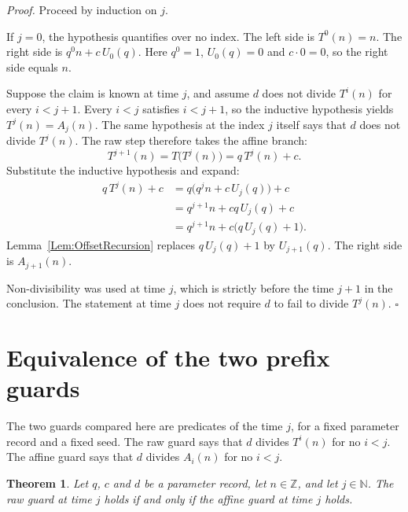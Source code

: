 \documentclass[11pt,letterpaper]{article}
\newcommand{\N}{\mathbb{N}}
\newcommand{\Z}{\mathbb{Z}}
\newtheorem{theorem}{Theorem}
\newenvironment{proof}{\noindent\textit{Proof.}}{\hfill\(\square\)}
\begin{document}
\begin{proof}
Proceed by induction on \(j\).

If \(j=0\), the hypothesis quantifies over no index. The left side is \(T^{0}(n)=n\). The right side is \(q^{0}n+c\,U_{0}(q)\). Here \(q^{0}=1\), \(U_{0}(q)=0\) and \(c\cdot 0=0\), so the right side equals \(n\).

Suppose the claim is known at time \(j\), and assume \(d\) does not divide \(T^{i}(n)\) for every \(i<j+1\). Every \(i<j\) satisfies \(i<j+1\), so the inductive hypothesis yields \(T^{j}(n)=A_{j}(n)\). The same hypothesis at the index \(j\) itself says that \(d\) does not divide \(T^{j}(n)\). The raw step therefore takes the affine branch:
\[
T^{j+1}(n)=T\bigl(T^{j}(n)\bigr)=q\,T^{j}(n)+c.
\]
Substitute the inductive hypothesis and expand:
\begin{align*}
q\,T^{j}(n)+c
&= q\bigl(q^{j}n+c\,U_{j}(q)\bigr)+c \\
&= q^{j+1}n+cq\,U_{j}(q)+c \\
&= q^{j+1}n+c\bigl(q\,U_{j}(q)+1\bigr).
\end{align*}
Lemma~\ref{Lem:OffsetRecursion} replaces \(q\,U_{j}(q)+1\) by \(U_{j+1}(q)\). The right side is \(A_{j+1}(n)\).

Non-divisibility was used at time \(j\), which is strictly before the time \(j+1\) in the conclusion. The statement at time \(j\) does not require \(d\) to fail to divide \(T^{j}(n)\).
\end{proof}

\section{Equivalence of the two prefix guards}

The two guards compared here are predicates of the time \(j\), for a fixed parameter record and a fixed seed. The raw guard says that \(d\) divides \(T^{i}(n)\) for no \(i<j\). The affine guard says that \(d\) divides \(A_{i}(n)\) for no \(i<j\).

\begin{theorem}\label{Thm:PrefixIff}
Let \(q\), \(c\) and \(d\) be a parameter record, let \(n\in\Z\), and let \(j\in\N\). The raw guard at time \(j\) holds if and only if the affine guard at time \(j\) holds.
\end{theorem}
\end{document}
